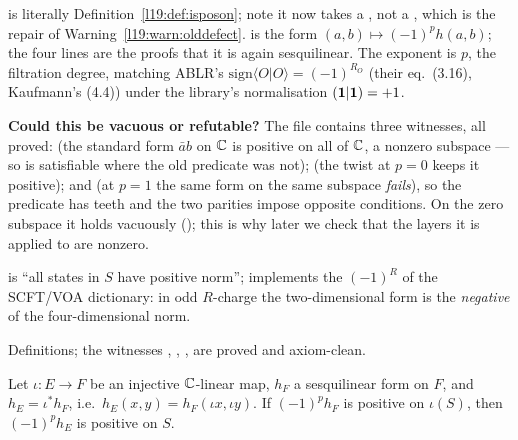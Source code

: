 \begin{dictionary}
 is literally Definition~\ref{l19:def:isposon}; note it now takes a
, not a , which is the repair of
Warning~\ref{l19:warn:olddefect}.  is the form $(a,b)\mapsto(-1)^ph(a,b)$; the
four  lines are the proofs that it is again sesquilinear. The exponent is $p$, the
filtration degree, matching ABLR's $\mathrm{sign}\langle O|O\rangle = (-1)^{R_O}$ (their eq.~(3.16),
Kaufmann's (4.4)) under the library's normalisation $(\mathbf{1}|\mathbf{1}) = +1$.

\textbf{Could this be vacuous or refutable?} The file contains three witnesses, all proved:
 (the standard form $\bar ab$ on ${\mathbb{C}}$ is positive on all of ${\mathbb{C}}$, a
nonzero subspace --- so  is satisfiable where the old predicate was not);
\allowbreak{}\allowbreak{}\allowbreak{} (the twist at $p=0$ keeps it positive); and
\allowbreak{}\allowbreak{}\allowbreak{}\allowbreak{} (at $p=1$ the same form on the same subspace \emph{fails}),
so the predicate has teeth and the two parities impose opposite conditions. On the zero subspace it
holds vacuously (); this is why later we check that the layers it is applied to are
nonzero.
\end{dictionary}

\begin{physics}
 is ``all states in $S$ have positive norm'';  implements the
$(-1)^R$ of the SCFT/VOA dictionary: in odd $R$-charge the two-dimensional form is the
\emph{negative} of the four-dimensional norm.
\end{physics}

\begin{status}
Definitions; the witnesses , \allowbreak{}\allowbreak{}\allowbreak{},
\allowbreak{}\allowbreak{}\allowbreak{}\allowbreak{},  are proved and axiom-clean.
\end{status}

\begin{theorem}\label{l19:thm:pullback}
Let $\iota:E\to F$ be an injective ${\mathbb{C}}$-linear map, $h_F$ a sesquilinear form on $F$, and
$h_E = \iota^*h_F$, i.e.\ $h_E(x,y) = h_F(\iota x,\iota y)$. If $(-1)^ph_F$ is positive on
$\iota(S)$, then $(-1)^ph_E$ is positive on $S$.
\end{theorem}

